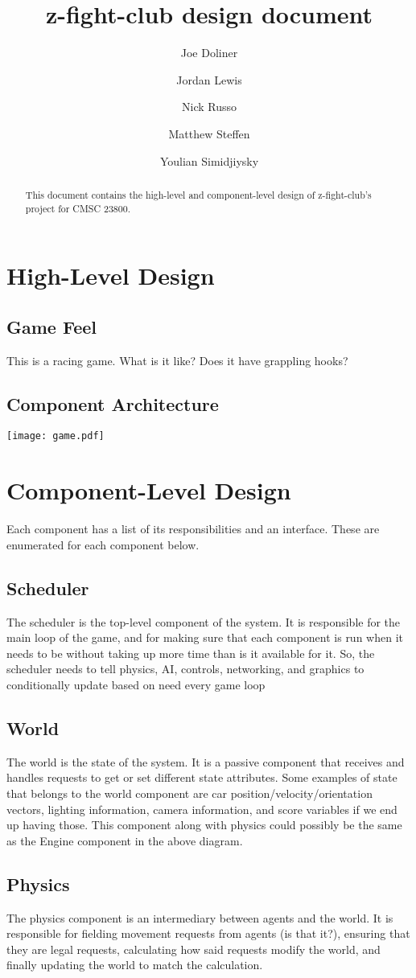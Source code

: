 \documentclass[12pt]{article}
\title{z-fight-club design document}
\author{Joe Doliner \and Jordan Lewis \and Nick Russo \and Matthew Steffen \and Youlian Simidjiysky}
\begin{document}
 \maketitle
\begin{abstract}
This document contains the high-level and component-level design of
z-fight-club's project for CMSC 23800.
\end{abstract}
\section{High-Level Design}
\subsection{Game Feel}
This is a racing game. What is it like? Does it have grappling hooks?
\subsection{Component Architecture}
\texttt{[image: game.pdf]}

\section{Component-Level Design}
Each component has a list of its responsibilities and an interface. These are
enumerated for each component below.
\subsection{Scheduler}
The scheduler is the top-level component of the system. It is responsible for
the main loop of the game, and for making sure that each component is run
when it needs to be without taking up more time than is it available for it.
So, the scheduler needs to tell physics, AI, controls, networking, and graphics
to conditionally update based on need every game loop
\subsection{World}
The world is the state of the system. It is a passive component that receives
and handles requests to get or set different state attributes. Some examples
of state that belongs to the world component are car
position/velocity/orientation vectors, lighting information, camera information,
and score variables if we end up having those. This component along with physics
could possibly be the same as the Engine component in the above diagram.
\subsection{Physics}
The physics component is an intermediary between agents and the world. It is
responsible for fielding movement requests from agents (is that it?), ensuring
that they are legal requests, calculating how said requests modify the world,
and finally updating the world to match the calculation.
\end{document}
